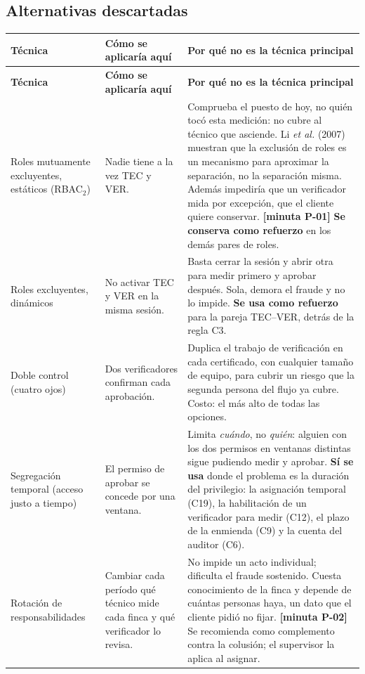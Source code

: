 \documentclass[11pt,letterpaper]{article}
\newcommand{\cab}[1]{\textbf{\rmfamily #1}}
\newcommand{\resp}[1]{\textrm{\footnotesize\bfseries [minuta #1]}}
\begin{document}
\Needspace{7cm}
\subsection{Alternativas descartadas}

{\small
\renewcommand{\arraystretch}{1.25}
\begin{longtable}{@{}L{3.1cm} L{4.2cm} L{8.4cm}@{}}
\toprule
\cab{Técnica} & \cab{Cómo se aplicaría aquí} & \cab{Por qué no es la técnica principal} \\
\midrule
\endfirsthead
\toprule
\cab{Técnica} & \cab{Cómo se aplicaría aquí} & \cab{Por qué no es la técnica principal} \\
\midrule
\endhead
\bottomrule
\endfoot
Roles mutuamente excluyentes, estáticos (RBAC$_2$) &
Nadie tiene a la vez TEC y VER. &
Comprueba el puesto de hoy, no quién tocó esta medición: no cubre al técnico que asciende. Li
\emph{et al.} (2007) muestran que la exclusión de roles es un mecanismo para aproximar la separación,
no la separación misma. Además impediría que un verificador mida por excepción, que el cliente quiere
conservar. \resp{P-01} \textbf{Se conserva como refuerzo} en los demás pares de roles. \\
Roles excluyentes, dinámicos &
No activar TEC y VER en la misma sesión. &
Basta cerrar la sesión y abrir otra para medir primero y aprobar después. Sola, demora el fraude y no
lo impide. \textbf{Se usa como refuerzo} para la pareja TEC--VER, detrás de la regla C3. \\
Doble control (cuatro ojos) &
Dos verificadores confirman cada aprobación. &
Duplica el trabajo de verificación en cada certificado, con cualquier tamaño de equipo, para cubrir
un riesgo que la segunda persona del flujo ya cubre. Costo: el más alto de todas las opciones. \\
Segregación temporal (acceso justo a tiempo) &
El permiso de aprobar se concede por una ventana. &
Limita \emph{cuándo}, no \emph{quién}: alguien con los dos permisos en ventanas distintas sigue
pudiendo medir y aprobar. \textbf{Sí se usa} donde el problema es la duración del privilegio: la
asignación temporal (C19), la habilitación de un verificador para medir (C12), el plazo de la
enmienda (C9) y la cuenta del auditor (C6). \\
Rotación de responsabilidades &
Cambiar cada período qué técnico mide cada finca y qué verificador lo revisa. &
No impide un acto individual; dificulta el fraude sostenido. Cuesta conocimiento de la finca y
depende de cuántas personas haya, un dato que el cliente pidió no fijar. \resp{P-02} Se recomienda
como complemento contra la colusión; el supervisor la aplica al asignar. \\
\end{longtable}
}
\end{document}
